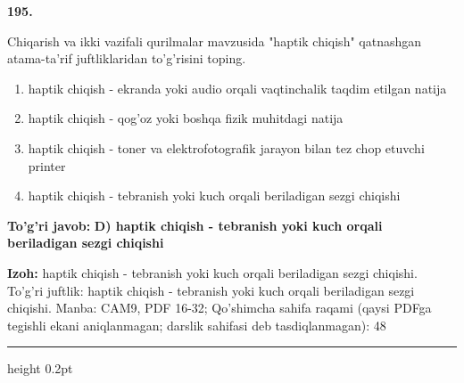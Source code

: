 \documentclass[10pt,a4paper]{article}
\begin{document}
{\bfseries\sffamily\color{ink} 195.}
\par
Chiqarish va ikki vazifali qurilmalar mavzusida "haptik chiqish" qatnashgan atama-ta'rif juftliklaridan to'g'risini toping.
\begin{enumerate}[label=\Alph*),leftmargin=9mm]
\item haptik chiqish - ekranda yoki audio orqali vaqtinchalik taqdim etilgan natija
\item haptik chiqish - qog'oz yoki boshqa fizik muhitdagi natija
\item haptik chiqish - toner va elektrofotografik jarayon bilan tez chop etuvchi printer
\item haptik chiqish - tebranish yoki kuch orqali beriladigan sezgi chiqishi
\end{enumerate}
\begin{tcolorbox}[enhanced,breakable,colback=teal!4,colframe=teal!60!black,boxrule=0.45pt,arc=1.2mm,left=2.7mm,right=2.7mm,top=1.8mm,bottom=1.8mm,before skip=2mm,after skip=2mm]
{\bfseries\sffamily\color{teal}To'g'ri javob:} \textbf{D) haptik chiqish - tebranish yoki kuch orqali beriladigan sezgi chiqishi}
\par\smallskip
{\bfseries Izoh:} haptik chiqish - tebranish yoki kuch orqali beriladigan sezgi chiqishi. To'g'ri juftlik: haptik chiqish - tebranish yoki kuch orqali beriladigan sezgi chiqishi. Manba: CAM9, PDF 16-32; Qo'shimcha sahifa raqami (qaysi PDFga tegishli ekani aniqlanmagan; darslik sahifasi deb tasdiqlanmagan): 48
\end{tcolorbox}
\vspace{2mm}\hrule height 0.2pt\vspace{3mm}
\end{document}
